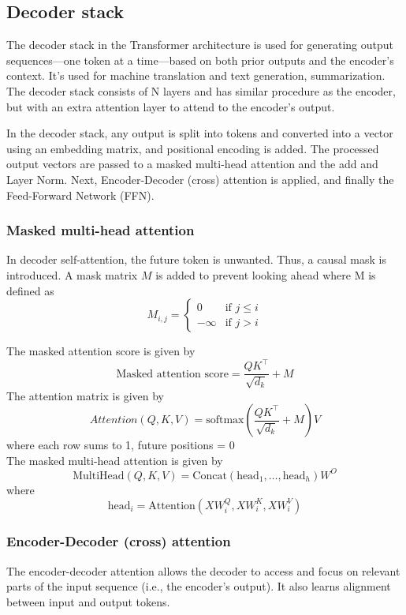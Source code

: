 \documentclass{article} %
\begin{document}
\subsection{Decoder stack}
The decoder stack in the Transformer architecture is used for generating output sequences—one token at a time—based on both prior outputs and the encoder’s context. It’s used for machine translation and text generation, summarization. The decoder stack consists of N layers and has similar procedure as the encoder, but with an extra attention layer to attend to the encoder’s output.

In the decoder stack, any output is split into tokens and converted into a vector using an embedding matrix, and positional encoding is added. The processed output vectors are passed to a masked multi-head attention and the add and Layer Norm. Next, Encoder-Decoder (cross) attention is applied, and finally the Feed-Forward Network (FFN).

\subsubsection{Masked multi-head attention}
In decoder self-attention, the future token is unwanted. Thus, a causal mask is introduced. A mask matrix \( M \) is added to prevent looking ahead where M is defined as
\[
M_{i,j} = 
\begin{cases} 
0 & \text{if } j \leq i \\ 
-\infty & \text{if } j > i 
\end{cases}
\]

The masked attention score is given by
\[
\text{Masked attention score} = \frac{QK^\top}{\sqrt{d_k}} + M
\]
The attention matrix is given by
\[ Attention (Q, K, V) = \text{softmax}(\frac{QK^\top}{\sqrt{d_k}} + M) V \] \quad where each row sums to 1, future positions = 0\\
The masked multi-head attention is given by \[
    \text{MultiHead}(Q, K, V) = \text{Concat}(\text{head}_1, \dots, \text{head}_h)W^O
    \] where
    \[
\text{head}_i = \text{Attention}(XW_i^Q, XW_i^K, XW_i^V)
    \]

\subsubsection{Encoder-Decoder (cross) attention}
The encoder-decoder attention allows the decoder to access and focus on relevant parts of the input sequence (i.e., the encoder’s output). It also learns alignment between input and output tokens.
\end{document}
